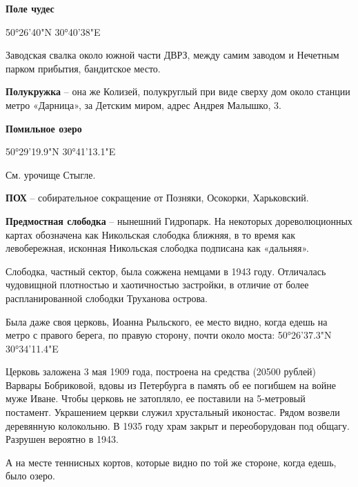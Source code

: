 \medskip

\textbf{Поле чудес}

50°26'40"N 30°40'38"E

Заводская свалка около южной части ДВРЗ, между самим заводом и Нечетным парком прибытия, бандитское место.\\

\medskip

\textbf{Полукружка} – она же Колизей, полукруглый при виде сверху дом около станции метро «Дарница», за Детским миром, адрес Андрея Малышко, 3.\\

\medskip

\textbf{Помильное озеро}

50°29'19.9"N 30°41'13.1"E

См. урочище Стыгле.\\

\medskip

\textbf{ПОХ} – собирательное сокращение от Позняки, Осокорки, Харьковский.\\

\medskip

\textbf{Предмостная слободка} – нынешний Гидропарк. На некоторых дореволюционных картах обозначена как Никольская слободка ближняя, в то время как левобережная, исконная Никольская слободка подписана как «дальняя».

Слободка, частный сектор, была сожжена немцами в 1943 году. Отличалась чудовищной плотностью и хаотичностью застройки, в отличие от более распланированной слободки Труханова острова. 

Была даже своя церковь, Иоанна Рыльского, ее место видно, когда едешь на метро с правого берега, по правую сторону, почти около моста: 50°26'37.3"N 30°34'11.4"E

Церковь заложена 3 мая 1909 года, построена на средства  (20500 рублей) Варвары Бобриковой, вдовы из Петербурга в память об ее погибшем на войне муже Иване. Чтобы церковь не затопляло, ее поставили на 5-метровый постамент. Украшением церкви служил хрустальный иконостас. Рядом возвели деревянную колокольню. В 1935 году храм закрыт и переоборудован под общагу. Разрушен вероятно в 1943.

А на месте теннисных кортов, которые видно по той же стороне, когда едешь, было озеро.\\

\medskip



